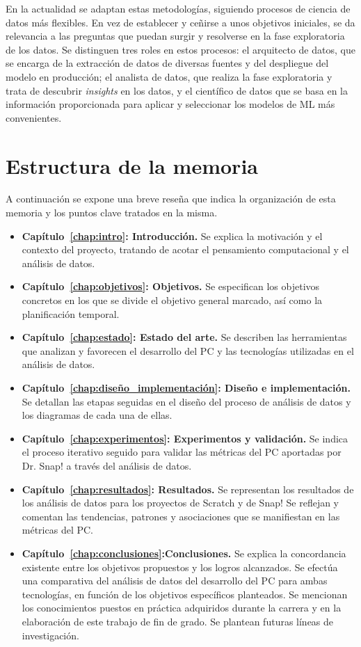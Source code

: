 \documentclass[a4paper, 12pt]{book}
\begin{document}
En la actualidad se adaptan estas metodologías, siguiendo procesos de ciencia de datos más flexibles. En vez de establecer y ceñirse a unos objetivos iniciales, se da relevancia a las preguntas que puedan surgir y resolverse en la fase exploratoria de los datos. Se distinguen tres roles en estos procesos: el arquitecto de datos, que se encarga de la extracción de datos de diversas fuentes y del despliegue del modelo en producción; el analista de datos, que realiza la fase exploratoria y trata de descubrir \emph{insights} en los datos, y el científico de datos que se basa en la información proporcionada para aplicar y seleccionar los modelos de ML más convenientes.

\section{Estructura de la memoria}
\label{sec:estructura}

A continuación se expone una breve reseña que indica la organización de esta memoria y los puntos clave tratados en la misma. 

\begin{itemize}
    \item \textbf{Capítulo~\ref{chap:intro}: Introducción.} Se explica la motivación y el contexto del proyecto, tratando de acotar el pensamiento computacional y el análisis de datos.
    \item \textbf{Capítulo~\ref{chap:objetivos}: Objetivos.} Se especifican los objetivos concretos en los que se divide el objetivo general marcado, así como la planificación temporal.
    \item \textbf{Capítulo~\ref{chap:estado}: Estado del arte.} Se describen las herramientas que analizan y favorecen el desarrollo del PC y las tecnologías utilizadas en el análisis de datos.
    \item \textbf{Capítulo~\ref{chap:diseño_implementación}: Diseño e implementación.} Se detallan las etapas seguidas en el diseño del proceso de análisis de datos y los diagramas de cada una de ellas.
    \item \textbf{Capítulo~\ref{chap:experimentos}: Experimentos y validación.} Se indica el proceso iterativo seguido para validar las métricas del PC aportadas por Dr. Snap! a través del análisis de datos.
    \item \textbf{Capítulo~\ref{chap:resultados}: Resultados.} Se representan los resultados de los análisis de datos para los proyectos de Scratch y de Snap! Se reflejan y comentan las tendencias, patrones y asociaciones que se manifiestan en las métricas del PC. 
    \item \textbf{Capítulo~\ref{chap:conclusiones}:Conclusiones.} Se explica la concordancia existente entre los objetivos propuestos y los logros alcanzados. Se efectúa una comparativa del análisis de datos del desarrollo del PC para ambas tecnologías, en función de los objetivos específicos planteados. Se mencionan los conocimientos puestos en práctica adquiridos durante la carrera y en la elaboración de este trabajo de fin de grado. Se plantean futuras líneas de investigación. 
\end{itemize}
\end{document}
